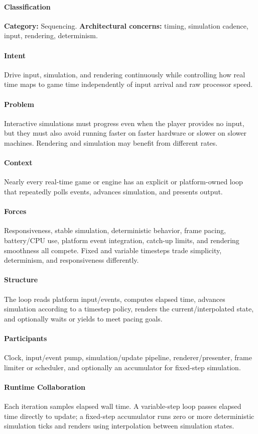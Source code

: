 \documentclass[11pt]{article}
\begin{document}
\paragraph{Classification} \textbf{Category:} Sequencing. \textbf{Architectural concerns:} timing, simulation cadence, input, rendering, determinism.
\paragraph{Intent} Drive input, simulation, and rendering continuously while controlling how real time maps to game time independently of input arrival and raw processor speed.
\paragraph{Problem} Interactive simulations must progress even when the player provides no input, but they must also avoid running faster on faster hardware or slower on slower machines. Rendering and simulation may benefit from different rates.
\paragraph{Context} Nearly every real-time game or engine has an explicit or platform-owned loop that repeatedly polls events, advances simulation, and presents output.
\paragraph{Forces} Responsiveness, stable simulation, deterministic behavior, frame pacing, battery/CPU use, platform event integration, catch-up limits, and rendering smoothness all compete. Fixed and variable timesteps trade simplicity, determinism, and responsiveness differently.
\paragraph{Structure} The loop reads platform input/events, computes elapsed time, advances simulation according to a timestep policy, renders the current/interpolated state, and optionally waits or yields to meet pacing goals.
\paragraph{Participants} Clock, input/event pump, simulation/update pipeline, renderer/presenter, frame limiter or scheduler, and optionally an accumulator for fixed-step simulation.
\paragraph{Runtime Collaboration} Each iteration samples elapsed wall time. A variable-step loop passes elapsed time directly to update; a fixed-step accumulator runs zero or more deterministic simulation ticks and renders using interpolation between simulation states.
\end{document}
